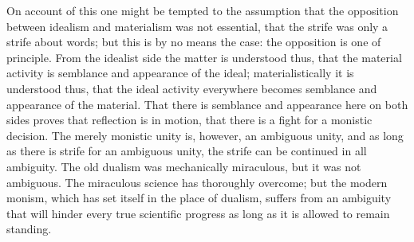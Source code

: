 \documentclass[12pt,a4paper,openany]{book}
\begin{document}
On account of this one might be tempted to the assumption that the opposition between
idealism and materialism was not essential, that the strife was only a strife about
words; but this is by no means the case: the opposition is one of principle. From the
idealist side the matter is understood thus, that the material activity is semblance
and appearance of the ideal; materialistically it is understood thus, that the ideal
activity everywhere becomes semblance and appearance of the material. That there is
semblance and appearance here on both sides proves that reflection is in motion, that
there is a fight for a monistic decision. The merely monistic unity is, however, an
ambiguous unity, and as long as there is strife for an ambiguous unity, the strife can
be continued in all ambiguity. The old dualism was mechanically miraculous, but it was
not ambiguous. The miraculous science has thoroughly overcome; but the modern monism,
which has set itself in the place of dualism, suffers from an ambiguity that will
hinder every true scientific progress as long as it is allowed to remain standing.
\end{document}
